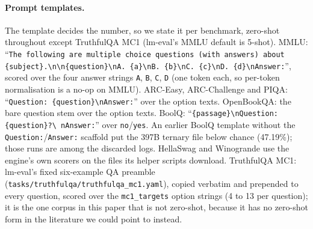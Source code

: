\documentclass[10pt]{article} %
\begin{document}
\paragraph{Prompt templates.} The template decides the number, so we state it
per benchmark, zero-shot throughout except TruthfulQA MC1 (lm-eval's MMLU default is 5-shot).
MMLU: ``\texttt{The following are multiple choice questions (with answers)
about \{subject\}.\textbackslash n\textbackslash n\{question\}\textbackslash nA.
\{a\}\textbackslash nB. \{b\}\textbackslash nC. \{c\}\textbackslash nD.
\{d\}\textbackslash nAnswer:}'', scored over the four answer strings
\texttt{A}, \texttt{B}, \texttt{C}, \texttt{D} (one token each, so per-token
normalisation is a no-op on MMLU). ARC-Easy, ARC-Challenge and PIQA:
``\texttt{Question: \{question\}\textbackslash nAnswer:}'' over the option
texts. OpenBookQA: the bare question stem over the option texts. BoolQ:
``\texttt{\{passage\}\textbackslash nQuestion: \{question\}?\textbackslash
nAnswer:}'' over \texttt{no}/\texttt{yes}. An earlier BoolQ template without
the \texttt{Question:}/\texttt{Answer:} scaffold put the 397B ternary file
below chance (47.19\%); those runs are among the discarded logs. HellaSwag and
Winogrande use the engine's own scorers on the files its helper scripts
download. TruthfulQA MC1: lm-eval's fixed six-example QA preamble
(\texttt{tasks/truthfulqa/truthfulqa\_mc1.yaml}), copied verbatim and
prepended to every question, scored over the \texttt{mc1\_targets} option
strings (4 to 13 per question); it is the one corpus in this paper that is
not zero-shot, because it has no zero-shot form in the literature we could
point to instead.
\end{document}

